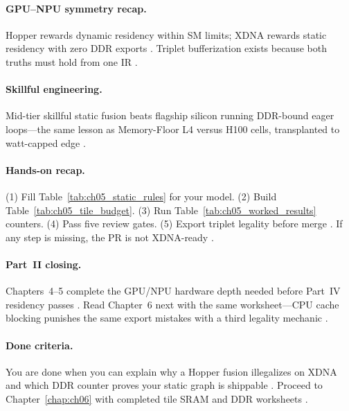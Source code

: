 \paragraph{GPU--NPU symmetry recap.}
Hopper rewards dynamic residency within SM limits; XDNA rewards static residency with zero DDR exports \citep{nvidia2022hopper,amd2024xdna,semianalysis2024tma}.
Triplet bufferization exists because both truths must hold from one IR \citep{yirage2026,patel2025llminference}.

\paragraph{Skillful engineering.}
Mid-tier skillful static fusion beats flagship silicon running DDR-bound eager loops---the same lesson as Memory-Floor L4 versus H100 cells, transplanted to watt-capped edge \citep{memoryfloor2026,taxbreak2026,dao2022flashattention,yirage2026}.

\paragraph{Hands-on recap.}
(1) Fill Table~\ref{tab:ch05_static_rules} for your model. (2) Build Table~\ref{tab:ch05_tile_budget}. (3) Run Table~\ref{tab:ch05_worked_results} counters. (4) Pass five review gates. (5) Export triplet legality before merge \citep{taxbreak2026,memoryfloor2026,yirage2026,patel2025llminference,amd2024xdna}.
If any step is missing, the PR is not XDNA-ready \citep{chen2020compilerbasedhardw,amd2024aie}.

\paragraph{Part~II closing.}
Chapters~4--5 complete the GPU/NPU hardware depth needed before Part~IV residency passes \citep{yirage2026,chen2020compilerbasedhardw,amd2024xdna,nvidia2022hopper}.
Read Chapter~6 next with the same worksheet---CPU cache blocking punishes the same export mistakes with a third legality mechanic \citep{dlbook,patel2025llminference}.

\paragraph{Done criteria.}
You are done when you can explain why a Hopper fusion illegalizes on XDNA and which DDR counter proves your static graph is shippable \citep{memoryfloor2026,taxbreak2026,amd2024aie}.
Proceed to Chapter~\ref{chap:ch06} with completed tile SRAM and DDR worksheets \citep{chen2020compilerbasedhardw,yirage2026}.

